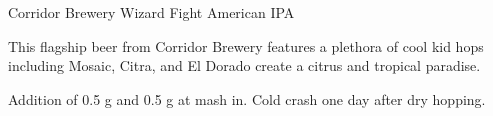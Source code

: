 \begin{recipie}{Corridor Brewery Wizard Fight American IPA}

\begin{aboutblock}
This flagship beer from Corridor Brewery features a plethora of cool kid hops
including Mosaic, Citra, and El Dorado create a citrus and tropical paradise.
\end{aboutblock}


\begin{methodandtiming}
 
\begin{mashsteps}
\end{mashsteps}

\begin{fermentationsteps}
\end{fermentationsteps}

\begin{directions}
Addition of 0.5 g  and 0.5 g  at mash in. Cold crash one
day after dry hopping.
\end{directions}

\end{methodandtiming}

\pagebreak

\begin{ingredientsblock}

\begin{malts}
\end{malts}

\begin{hops}
\end{hops}

\begin{yeasts}
\end{yeasts}

\end{ingredientsblock}

\end{recipie}

